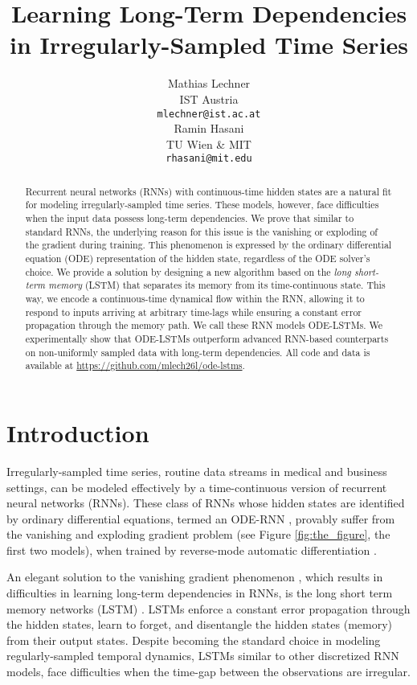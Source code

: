 \documentclass{article}
\title{Learning Long-Term Dependencies in Irregularly-Sampled Time Series}
\author{Mathias Lechner \\
  IST Austria\\
\texttt{mlechner@ist.ac.at} \\
\And
  Ramin Hasani \\
  TU Wien \& MIT\\
\texttt{rhasani@mit.edu} \\
}
\begin{document}
\maketitle

\begin{abstract}
Recurrent neural networks (RNNs) with continuous-time hidden states are a natural fit for modeling irregularly-sampled time series. These models, however, face difficulties when the input data possess long-term dependencies. We prove that similar to standard RNNs, the underlying reason for this issue is the vanishing or exploding of the gradient during training. This phenomenon is expressed by the ordinary differential equation (ODE) representation of the hidden state, regardless of the ODE solver's choice. We provide a solution by designing a new algorithm based on the \emph{long short-term memory} (LSTM) that separates its memory from its time-continuous state. This way, we encode a continuous-time dynamical flow within the RNN, allowing it to respond to inputs arriving at arbitrary time-lags while ensuring a constant error propagation through the memory path. We call these RNN models ODE-LSTMs. We experimentally show that ODE-LSTMs outperform advanced RNN-based counterparts on non-uniformly sampled data with long-term dependencies.
All code and data is available at \url{https://github.com/mlech26l/ode-lstms}.
\end{abstract}

\section{Introduction}
Irregularly-sampled time series, routine data streams in medical and business settings, can be modeled effectively by a time-continuous version of recurrent neural networks (RNNs). These class of RNNs whose hidden states are identified by ordinary differential equations, termed an ODE-RNN \cite{rubanova2019latent}, provably suffer from the vanishing and exploding gradient problem (see Figure \ref{fig:the_figure}, the first two models), when trained by reverse-mode automatic differentiation \cite{rumelhart1986learning,pontryagin2018mathematical}. 

An elegant solution to the vanishing gradient phenomenon \cite{hochreiter1991untersuchungen,bengio1994learning}, which results in difficulties in learning long-term dependencies in RNNs, is the long short term memory networks (LSTM) \cite{hochreiter1997long}. LSTMs enforce a constant error propagation through the hidden states, learn to forget, and disentangle the hidden states (memory) from their output states. Despite becoming the standard choice in modeling regularly-sampled temporal dynamics, LSTMs similar to other discretized RNN models, face difficulties when the time-gap between the observations are irregular.
\end{document}
